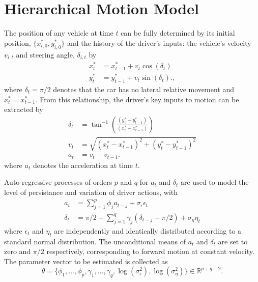 \documentclass[12pt,a4paper]{article}\usepackage[]{graphicx}\usepackage[]{color}
\begin{document}
\section{Hierarchical Motion Model}

The position of any vehicle at time $t$ can be fully determined by its initial position, $\{x^*_{i, 0}, y^*_{i, 0}\}$ and the history of the driver's inputs: the vehicle's velocity $v_{i, t}$ and steering angle, $\delta_{i, t}$ by
\begin{align}
x^*_{t} &= x^*_{t-1} + v_{t} \cos(\delta_{t}) \label{xEq} \\
y^*_{t} &= y^*_{t-1} + v_{t} \sin(\delta_{t}). \label{yEq},
\end{align}
where $\delta_{t} = \pi/2$ denotes that the car has no lateral relative movement and $x^*_{t} = x^*_{t-1}$.
From this relationship, the driver's key inputs to motion can be extracted by
\begin{align}
\delta_{t} &= \tan^{-1}\left(\frac{(y^*_{t} - y^*_{t-1})}{(x^*_{t} - x^*_{t-1})} \right) \label{dEq} \\
v_{t} &= \sqrt{(x^*_{t} - x^*_{t-1})^2 + (y^*_{t} - y^*_{t-1})^2} \label{vEq} \\
a_{t} &= v_{t} - v_{t-1}. \label{aEq}
\end{align}
where $a_{t}$ denotes the acceleration at time $t$.

Auto-regressive processes of orders $p$ and $q$ for $a_t$ and  $\delta_t$ are used to model the level of persistance and variation of driver actions, with
\begin{align}
a_{t} &= \sum_{j = 1}^p \phi_{j} a_{t-j} + \sigma_{\epsilon} \epsilon_{t} \label{aAR} \\
\delta_{t} &= \pi/2 + \sum_{j = 1}^q \gamma_{j} (\delta_{t-j} - \pi/2) + \sigma_{\eta} \eta_{t} \label{dAR}
\end{align}
where $\epsilon_{t}$ and $\eta_t$ are independently and identically distributed according to a standard normal distribution. The unconditional means of $a_t$ and $\delta_t$ are set to zero and $\pi/2$ respectively, corresponding to forward motion at constant velocity. The parameter vector to be estimated is collected as 
\begin{equation*}
\label{thetaVec}
\theta = \{\phi_{1}, \dots, \phi_{p}, \gamma_{1}, \dots, \gamma_{q}, \log(\sigma^{2}_{\epsilon}), \log(\sigma^{2}_{\eta})\} \in \mathbb{R}^{p + q + 2}.
\end{equation*}
\end{document}
